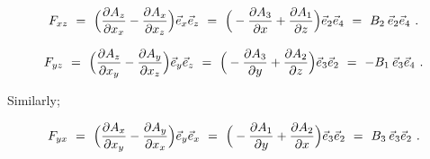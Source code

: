 \documentclass{article}
\begin{document}
\begin{equation} \label{eq:1002}
F_{x z} \hspace{0.125cm} = \hspace{0.125cm}  \Big( \frac{\partial{A_{z}}}{\partial{x_{x}}} - \frac{\partial{A_{x}}}{\partial{x_{z}}} \Big) \vec{e}_{x} \vec{e}_{z} \hspace{0.125cm} = \hspace{0.125cm} \Big( - \frac{\partial{A_{3}}}{\partial{x}} + \frac{\partial{A_{1}}}{\partial{z}} \Big) \vec{e}_{2} \vec{e}_{4} \hspace{0.125cm} = \hspace{0.125cm} B_2 \hspace{0.075cm} \vec{e}_{2} \vec{e}_{4} \hspace{0.125cm} .
\end{equation}

\begin{equation} \label{eq:1002}
F_{y z} \hspace{0.125cm} = \hspace{0.125cm}  \Big( \frac{\partial{A_{z}}}{\partial{x_{y}}} - \frac{\partial{A_{y}}}{\partial{x_{z}}} \Big) \vec{e}_{y} \vec{e}_{z} \hspace{0.125cm} = \hspace{0.125cm} \Big( - \frac{\partial{A_{3}}}{\partial{y}} + \frac{\partial{A_{2}}}{\partial{z}} \Big) \vec{e}_{3} \vec{e}_{2} \hspace{0.125cm} = \hspace{0.125cm} - B_1 \hspace{0.075cm} \vec{e}_{3} \vec{e}_{4} \hspace{0.125cm} .
\end{equation}

Similarly;

\begin{equation} \label{eq:1002}
F_{y x} \hspace{0.125cm} = \hspace{0.125cm}  \Big( \frac{\partial{A_{x}}}{\partial{x_{y}}} - \frac{\partial{A_{y}}}{\partial{x_{x}}} \Big) \vec{e}_{y} \vec{e}_{x} \hspace{0.125cm} = \hspace{0.125cm} \Big( - \frac{\partial{A_{1}}}{\partial{y}} + \frac{\partial{A_{2}}}{\partial{x}} \Big) \vec{e}_{3} \vec{e}_{2} \hspace{0.125cm} = \hspace{0.125cm} B_3 \hspace{0.075cm} \vec{e}_{3} \vec{e}_{2} \hspace{0.125cm} .
\end{equation}
\end{document}
